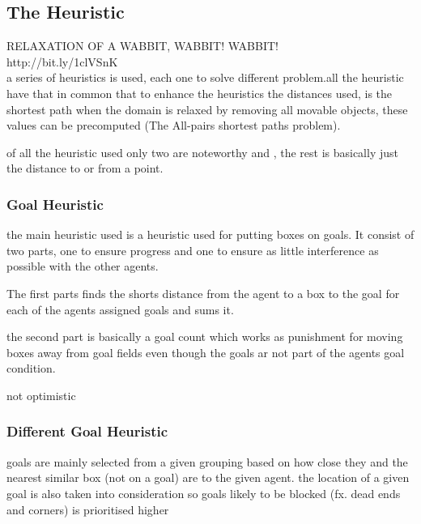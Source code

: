 \documentclass[letterpaper]{article}
\begin{document}
%		
		\subsection{The Heuristic}
			RELAXATION OF A WABBIT, WABBIT! WABBIT!\\
			http://bit.ly/1clVSnK\\
			a series of heuristics is used, each one to solve different problem.all the heuristic have that in common that to enhance the heuristics the distances used, is the shortest path when the domain is relaxed by removing all movable objects, these values can be precomputed (The All-pairs shortest paths problem).
					
			 of all the heuristic used only two are noteworthy  and , the rest is basically just the distance to or from a point.
			\subsubsection{Goal Heuristic}\label{Goal1}
			the main heuristic used is a heuristic used for putting boxes on goals.
			It consist of two parts, one to ensure progress and one to ensure as little interference as possible with the other agents.
			
			The first parts finds the shorts distance from the agent to a box to the goal for each of the agents assigned goals and sums it.
			
			the second part is basically a goal count which works as punishment for moving boxes away from goal fields even though the goals ar not part of the agents goal condition.
			
			not optimistic
			
			\subsubsection{Different Goal Heuristic}\label{goal2}
				goals are mainly selected from a given grouping based on how close they and the nearest similar box (not on a goal) are to the given agent. the location of a given goal is also taken into consideration so goals likely to be blocked (fx. dead ends and corners) is prioritised higher	
\end{document}
